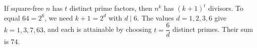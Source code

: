 If square-free $n$ has $t$ distinct prime factors, then $n^k$ has $(k+1)^t$ divisors. To equal $64=2^6$, we need $k+1=2^d$ with $d\mid6$. The values $d=1,2,3,6$ give $k=1,3,7,63$, and each is attainable by choosing $t=\dfrac{6}{d}$ distinct primes. Their sum is $\boxed{74}$.
